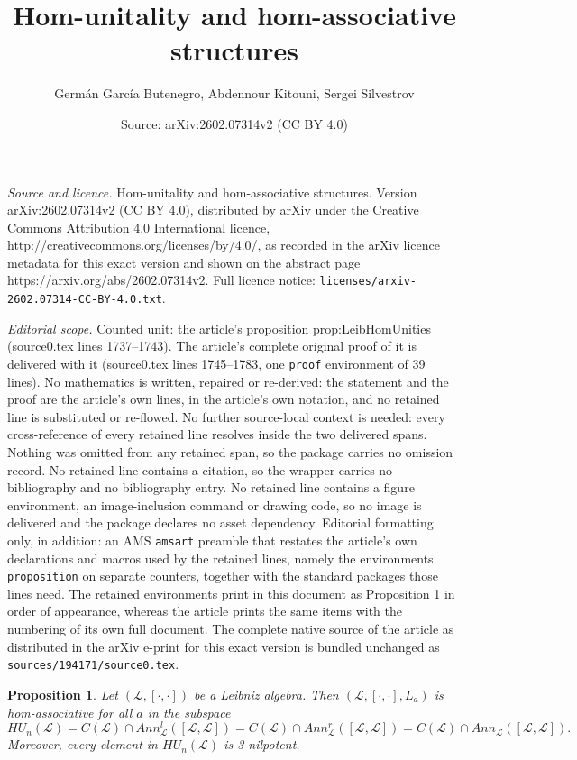 \documentclass[10pt,a4paper]{amsart}
\title{Hom-unitality and hom-associative structures}
\author{Germ\'an Garc\'ia Butenegro, Abdennour Kitouni, Sergei Silvestrov}
\date{Source: arXiv:2602.07314v2 (CC BY 4.0)}
\newtheorem{proposition}{Proposition}
\begin{document}
\maketitle

\noindent\emph{Source and licence.} Hom-unitality and hom-associative structures. Version arXiv:2602.07314v2 (CC BY 4.0), distributed by arXiv under the Creative Commons Attribution 4.0 International licence, http://creativecommons.org/licenses/by/4.0/, as recorded in the arXiv licence metadata for this exact version and shown on the abstract page https://arxiv.org/abs/2602.07314v2. Full licence notice: \texttt{licenses/arxiv-2602.07314-CC-BY-4.0.txt}.\par\smallskip

\noindent\textit{Editorial scope.} Counted unit: the article's proposition prop:LeibHomUnities (source0.tex lines 1737--1743). The article's complete original proof of it is delivered with it (source0.tex lines 1745--1783, one \texttt{proof} environment of 39 lines). No mathematics is written, repaired or re-derived: the statement and the proof are the article's own lines, in the article's own notation, and no retained line is substituted or re-flowed.  No further source-local context is needed: every cross-reference of every retained line resolves inside the two delivered spans.  Nothing was omitted from any retained span, so the package carries no omission record.  No retained line contains a citation, so the wrapper carries no bibliography and no bibliography entry.  No retained line contains a figure environment, an image-inclusion command or drawing code, so no image is delivered and the package declares no asset dependency.  Editorial formatting only, in addition: an AMS \texttt{amsart} preamble that restates the article's own declarations and macros used by the retained lines, namely the environments \texttt{proposition} on separate counters, together with the standard packages those lines need.  The retained environments print in this document as Proposition 1 in order of appearance, whereas the article prints the same items with the numbering of its own full document.  The complete native source of the article as distributed in the arXiv e-print for this exact version is bundled unchanged as \texttt{sources/194171/source0.tex}.
            \begin{proposition}\label{prop:LeibHomUnities}
				Let $(\mathcal{L},[\cdot,\cdot])$ be a Leibniz algebra. Then $(\mathcal{L},[\cdot,\cdot],L_a)$ is hom-associative for all $a$ in the subspace
				\begin{equation*}
					HU_n(\mathcal{L})=C(\mathcal{L})\cap Ann_\mathcal{L}^l([\mathcal{L},\mathcal{L}])=C(\mathcal{L})\cap Ann_\mathcal{L}^r([\mathcal{L},\mathcal{L}])=C(\mathcal{L})\cap Ann_\mathcal{L}([\mathcal{L},\mathcal{L}]).
				\end{equation*}
				Moreover, every element in $HU_n(\mathcal{L})$ is 3-nilpotent.
			\end{proposition}
\end{document}
